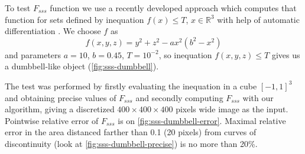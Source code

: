 \documentclass[1p]{elsarticle}
\begin{document}
To test $F_{sss}$ function we use a recently developed approach which computes
that function for sets defined by inequation $f(x) \le T$, $x \in \mathbb{R}^3$
with help of automatic differentiation \cite{postnicov20232}. We choose $f$ as
\begin{equation}
  f(x, y, z) = y^2 + z^2 - a x^2 (b^2 - x^2)
\end{equation}
and parameters $a = 10$, $b = 0.45$, $T = 10^{-2}$, so inequation
$f(x, y, z) \le T$ gives us a dumbbell-like object (\cref{fig:sss-dumbbell}).

The test was performed by firstly evaluating the inequation in a cube
$[-1, 1]^3$ and obtaining precise values of $F_{sss}$ and secondly computing
$F_{sss}$ with our algorithm, giving a discretized $400 \times 400 \times 400$
pixels wide image as the input. Pointwise relative error of $F_{sss}$ is on
\cref{fig:sss-dumbbell-error}. Maximal relative error in the area distanced
farther than 0.1 (20 pixels) from curves of discontinuity (look at
\cref{fig:sss-dumbbell-precise}) is no more than 20\%.
\end{document}
